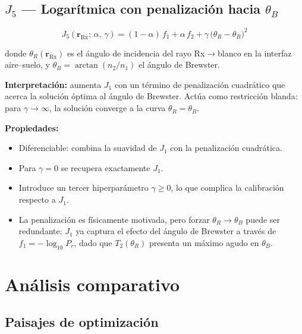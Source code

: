 \documentclass[11pt, a4paper]{article}
\newcommand{\Rx}{\mathrm{Rx}}
\newcommand{\rRx}{\mathbf{r}_{\Rx}}
\begin{document}
\subsection{\texorpdfstring{$J_5$}{J5} — Logarítmica con penalización hacia $\theta_B$}

\begin{equation}
  J_5(\rRx;\,\alpha,\,\gamma)
  = (1-\alpha)\,f_1 + \alpha\,f_2
    + \gamma\,\bigl(\theta_R - \theta_B\bigr)^2
  \label{eq:J5}
\end{equation}

donde $\theta_R(\rRx)$ es el ángulo de incidencia del rayo Rx$\to$blanco en la
interfaz aire–suelo, y $\theta_B = \arctan(n_2/n_1)$ el ángulo de Brewster.

\textbf{Interpretación:} aumenta $J_1$ con un término de penalización cuadrático que
acerca la solución óptima al ángulo de Brewster. Actúa como restricción blanda:
para $\gamma \to \infty$, la solución converge a la curva $\theta_R = \theta_B$.

\textbf{Propiedades:}
\begin{itemize}
  \item Diferenciable: combina la suavidad de $J_1$ con la penalización cuadrática.
  \item Para $\gamma = 0$ se recupera exactamente $J_1$.
  \item Introduce un tercer hiperparámetro $\gamma \geq 0$, lo que complica la
    calibración respecto a $J_1$.
  \item La penalización es físicamente motivada, pero forzar $\theta_R \to \theta_B$
    puede ser redundante: $J_1$ ya captura el efecto del ángulo de Brewster a través
    de $f_1 = -\log_{10}P_r$, dado que $T_2(\theta_R)$ presenta un máximo agudo
    en $\theta_B$.
\end{itemize}

\section{Análisis comparativo}

\subsection{Paisajes de optimización}
\end{document}
